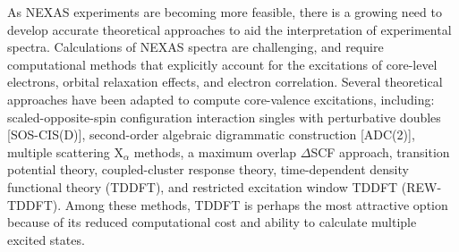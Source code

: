 \documentclass[12pt]{article}
\begin{document}
As NEXAS experiments are becoming more feasible, there is a growing need to develop accurate theoretical approaches to aid the interpretation of experimental spectra.
Calculations of NEXAS spectra are challenging, and require computational methods that explicitly account for the excitations of core-level electrons, orbital relaxation effects, and electron correlation. \cite{coriani_coupled-cluster_2012} Several theoretical approaches have been adapted to compute core-valence excitations, including: scaled-opposite-spin configuration interaction singles with perturbative doubles [SOS-CIS(D)],\cite{asmuruf_calculation_2008} second-order algebraic digrammatic construction [ADC(2)],\cite{schirmer_beyond_1982,trofimov_efficient_1995} multiple scattering X$_\alpha$ methods, \cite{sheehy_correlation_1989} a maximum overlap $\Delta$SCF approach, \cite{besley_self-consistent-field_2009} transition potential theory,\cite{triguero_calculations_1998} coupled-cluster response theory, \cite{coriani_coupled-cluster_2012} time-dependent density functional theory (TDDFT),\cite{stener_time_2003} and restricted excitation window TDDFT (REW-TDDFT). \cite{lopata_linear-response_2012} Among these methods, TDDFT is perhaps the most attractive option because of its reduced computational cost and ability to calculate multiple excited states.
\end{document}
